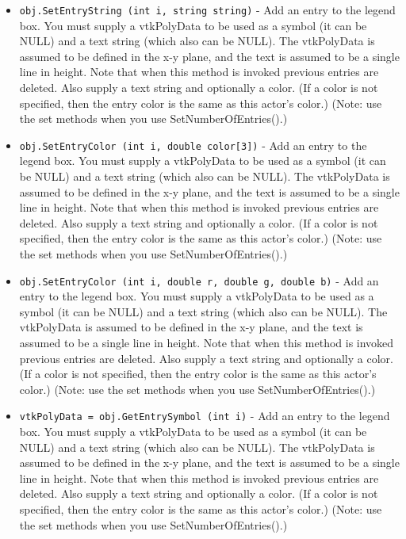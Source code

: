 \begin{itemize}
\item  \verb|obj.SetEntryString (int i, string string)| -  Add an entry to the legend box. You must supply a vtkPolyData to be
 used as a symbol (it can be NULL) and a text string (which also can
 be NULL). The vtkPolyData is assumed to be defined in the x-y plane,
 and the text is assumed to be a single line in height. Note that when
 this method is invoked previous entries are deleted. Also supply a text
 string and optionally a color. (If a color is not specified, then the
 entry color is the same as this actor's color.) (Note: use the set
 methods when you use SetNumberOfEntries().)

\item  \verb|obj.SetEntryColor (int i, double color[3])| -  Add an entry to the legend box. You must supply a vtkPolyData to be
 used as a symbol (it can be NULL) and a text string (which also can
 be NULL). The vtkPolyData is assumed to be defined in the x-y plane,
 and the text is assumed to be a single line in height. Note that when
 this method is invoked previous entries are deleted. Also supply a text
 string and optionally a color. (If a color is not specified, then the
 entry color is the same as this actor's color.) (Note: use the set
 methods when you use SetNumberOfEntries().)

\item  \verb|obj.SetEntryColor (int i, double r, double g, double b)| -  Add an entry to the legend box. You must supply a vtkPolyData to be
 used as a symbol (it can be NULL) and a text string (which also can
 be NULL). The vtkPolyData is assumed to be defined in the x-y plane,
 and the text is assumed to be a single line in height. Note that when
 this method is invoked previous entries are deleted. Also supply a text
 string and optionally a color. (If a color is not specified, then the
 entry color is the same as this actor's color.) (Note: use the set
 methods when you use SetNumberOfEntries().)

\item  \verb|vtkPolyData = obj.GetEntrySymbol (int i)| -  Add an entry to the legend box. You must supply a vtkPolyData to be
 used as a symbol (it can be NULL) and a text string (which also can
 be NULL). The vtkPolyData is assumed to be defined in the x-y plane,
 and the text is assumed to be a single line in height. Note that when
 this method is invoked previous entries are deleted. Also supply a text
 string and optionally a color. (If a color is not specified, then the
 entry color is the same as this actor's color.) (Note: use the set
 methods when you use SetNumberOfEntries().)


\end{itemize}
